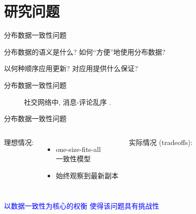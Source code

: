 \section{研究问题}

\begin{frame}{分布数据一致性问题}
  \graphicspath{{tikz-in-beamer/}}
  \begin{figure}[h!]
    \centering
    \begin{adjustbox}{max totalsize = {0.50\textwidth}{1.00\textheight}, center}
	  
    \end{adjustbox}
  \end{figure}

  \vspace{0.30cm}
  \begin{description}
	\item<3->[上层应用:] 分布数据的语义是什么? 如何``方便''地使用分布数据?
	\item<4->[数据副本:] 以何种顺序应用更新? 对应用提供什么保证?
  \end{description}
\end{frame}
\begin{frame}{分布数据一致性问题}
  \begin{figure}[h!]
    \centering
    \begin{adjustbox}{max totalsize = {0.70\textwidth}{1.00\textheight}, center}
	  
    \end{adjustbox}
	\caption{社交网络中, 消息-评论乱序 .}
  \end{figure}
\end{frame}
\begin{frame}{分布数据一致性问题}
  \begin{columns}[t]
	  理想情况:
	  \begin{itemize}
		\item one-size-fits-all\\一致性模型
		\item 始终观察到最新副本
	  \end{itemize}
    \pause
	实际情况 (tradeoffs):
  \end{columns}
  \pause
  \vspace{0.50cm}
  \begin{center}
	\textcolor{blue}{以数据一致性为核心的权衡  使得该问题具有挑战性}
  \end{center}
\end{frame}
